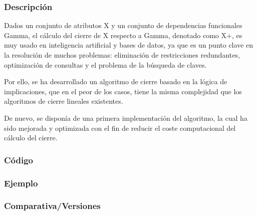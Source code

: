 \subsubsection{Descripci\'on} 
Dados un conjunto de atributos X y un conjunto de dependencias funcionales Gamma, el c\'alculo del cierre de X respecto a Gamma, denotado como X+, es muy usado en inteligencia artificial y bases de datos, ya que es un punto clave en la resoluci\'on de muchos problemas: eliminaci\'on de restricciones redundantes, optimizaci\'on de consultas y el problema de la b\'usqueda de claves.

Por ello, se ha desarrollado un algoritmo de cierre basado en la l\'ogica de implicaciones, que en el peor de los casos, tiene la misma complejidad que los algoritmos de cierre lineales existentes.

De nuevo, se dispon\'ia de una primera implementaci\'on del algoritmo, la cual ha sido mejorada y optimizada con el fin de reducir el coste computacional del c\'alculo del cierre.
\subsubsection{C\'odigo} 

\subsubsection{Ejemplo} 
\subsubsection{Comparativa/Versiones} 